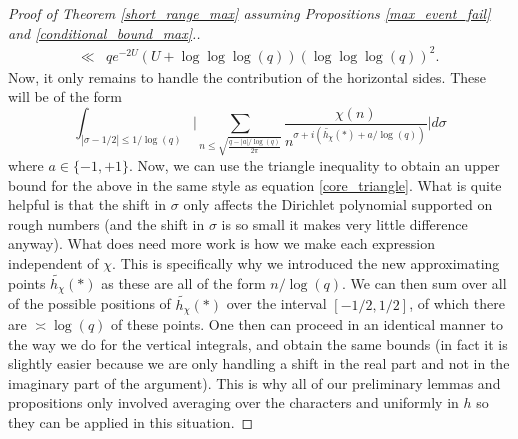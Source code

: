 \documentclass[reqno]{amsart}
\theoremstyle{definition}
\theoremstyle{remark}
\numberwithin{equation}{section}
\theoremstyle{remark}
\begin{document}
\begin{proof}[Proof of Theorem \ref{short_range_max} assuming Propositions \ref{max_event_fail} and \ref{conditional_bound_max}.]
\begin{align*}
        \ll& qe^{-2U}(U+\log\log\log(q))(\log\log\log(q))^2.
    \end{align*}
    Now, it only remains to handle the contribution of the horizontal sides. These will be of the form
    $$\int_{|\sigma-1/2| \leq1/\log(q)}\big|\sum_{n \leq \sqrt{\frac{q-|a|/\log(q)}{2\pi}}}\frac{\chi(n)}{n^{\sigma+i(\tilde{h_\chi}(*)+a/\log(q))}}\big|d\sigma$$
    where $a\in\{-1,+1\}$. Now, we can use the triangle inequality to obtain an upper bound for the above in the same style as equation \ref{core_triangle}. What is quite helpful is that the shift in $\sigma$ only affects the Dirichlet polynomial supported on rough numbers (and the shift in $\sigma$ is so small it makes very little difference anyway). What does need more work is how we make each expression independent of $\chi$. This is specifically why we introduced the new approximating points $\tilde{h_\chi}(*)$ as these are all of the form $n/\log(q)$. We can then sum over all of the possible positions of $\tilde{h_\chi}(*)$ over the interval $[-1/2,1/2]$, of which there are $\asymp \log(q)$ of these points. One then can proceed in an identical manner to the way we do for the vertical integrals, and obtain the same bounds (in fact it is slightly easier because we are only handling a shift in the real part and not in the imaginary part of the argument). This is why all of our preliminary lemmas and propositions only involved averaging over the characters and uniformly in $h$ so they can be applied in this situation.
\end{proof}
\end{document}
